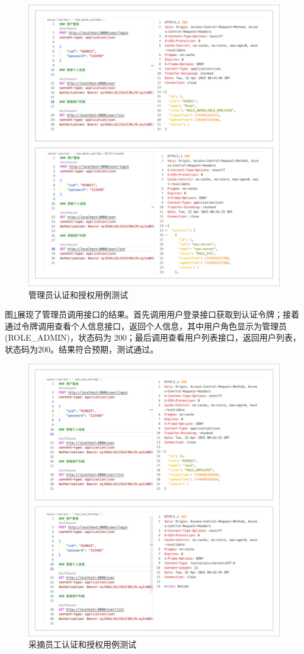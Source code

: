 \begin{figure}[H]
    \centering
    \includegraphics[width=0.9\linewidth]{../result/user-auth-admin.png}
    \caption{管理员认证和授权用例测试}
    \label{fig:user-auth-admin}
\end{figure}

图\ref{fig:user-auth-admin}展现了管理员调用接口的结果。首先调用用户登录接口获取到认证令牌；接着通过令牌调用查看个人信息接口，返回个人信息，其中用户角色显示为管理员(ROLE\_ADMIN)，状态码为 200；最后调用查看用户列表接口，返回用户列表，状态码为200。结果符合预期，测试通过。

\begin{figure}[H]
    \centering
    \includegraphics[width=0.9\linewidth]{../result/user-auth-emp.png}
    \caption{采摘员工认证和授权用例测试}
    \label{fig:user-auth-emp}
\end{figure}

